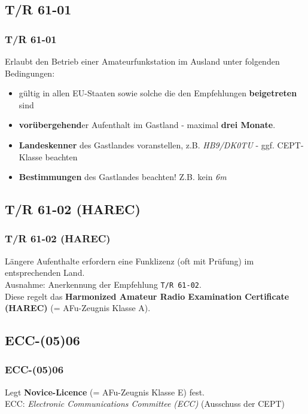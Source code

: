 \subsection{T/R 61-01}

\begin{frame}
    \frametitle{T/R 61-01}

    Erlaubt den Betrieb einer Amateurfunkstation im Ausland unter folgenden
    Bedingungen:

    \begin{itemize}
        \item gültig in allen EU-Staaten sowie solche die den Empfehlungen \textbf{beigetreten} sind
        \item \textbf{vorübergehend}er Aufenthalt im Gastland - maximal \textbf{drei Monate}.
        \item \textbf{Landeskenner} des Gastlandes voranstellen, z.B. \emph{HB9/DK0TU} - ggf. CEPT-Klasse beachten
        \item \textbf{Bestimmungen} des Gastlandes beachten! Z.B. kein \emph{6m}
    \end{itemize}

\end{frame}

\subsection{T/R 61-02 (HAREC)}

\begin{frame}
    \frametitle{T/R 61-02 (HAREC)}

    Längere Aufenthalte erfordern eine Funklizenz (oft mit Prüfung) im
    entsprechenden Land. \\[1em]

    Ausnahme: Anerkennung der Empfehlung \texttt{T/R 61-02}. \\[1em]

    Diese regelt das \textbf{Harmonized Amateur Radio Examination
    Certificate (HAREC)} (= AFu-Zeugnis Klasse A).

\end{frame}

\subsection{ECC-(05)06}

\begin{frame}
    \frametitle{ECC-(05)06}

    Legt \textbf{Novice-Licence} (= AFu-Zeugnis Klasse E) fest. \\[2em]

    ECC: \emph{Electronic Communications Committee (ECC)} (Ausschuss der CEPT)

\end{frame}

